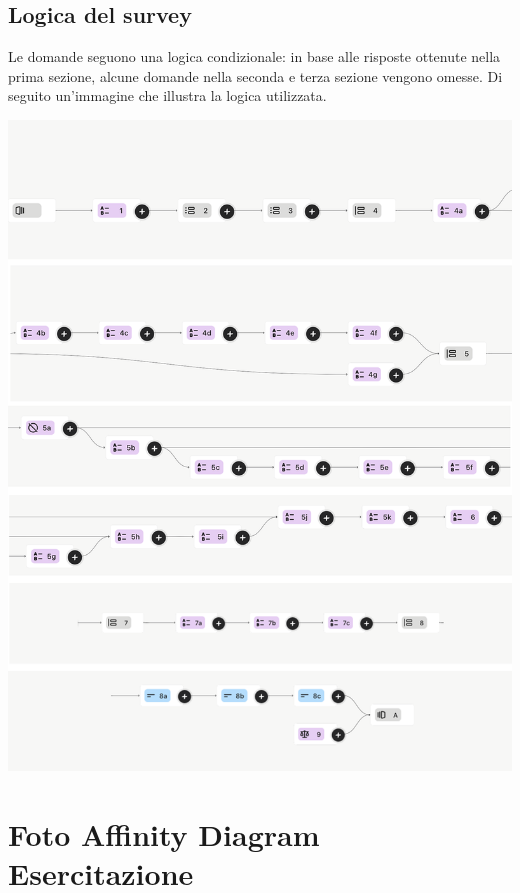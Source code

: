 \documentclass{article}
\begin{document}
\subsection{Logica del survey}
Le domande seguono una logica condizionale: in base alle risposte ottenute nella prima sezione, alcune domande nella seconda e terza sezione vengono omesse. Di seguito un'immagine che illustra la logica utilizzata.
\vspace*{\fill}
\begin{center}
    \includegraphics[width=\textwidth]{form_logic.png} %
\end{center}
\vspace*{\fill}

\section{Foto Affinity Diagram Esercitazione}
\end{document}
